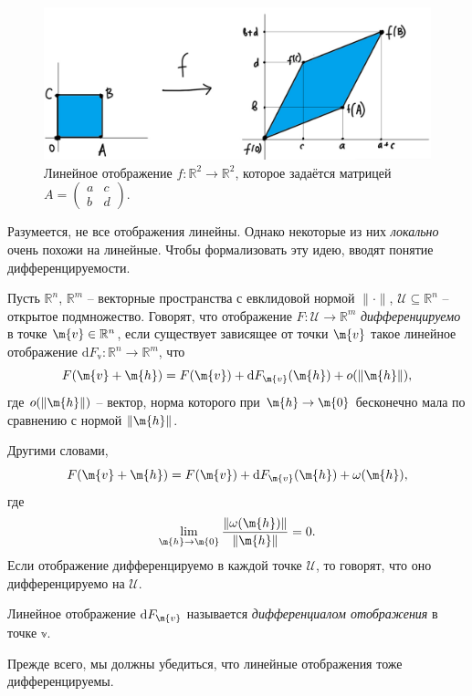 \begin{figure}[h!]
    \centering
    \includegraphics[scale = 0.5]{images/linear_map.jpg}
    \caption{Линейное отображение $f:\mathbb{R}^2 \to \mathbb{R}^2$, которое задаётся матрицей $A = \begin{pmatrix}
        a & c \\
        b & d
    \end{pmatrix}.$}
    \label{linear_map}
\end{figure}

Разумеется, не все отображения линейны. Однако некоторые из них \textit{локально} очень похожи на линейные. Чтобы формализовать эту идею, вводят понятие дифференцируемости.


\begin{definition}\label{diff_of_map(function)}
    Пусть $\mathbb{R}^n$, $\mathbb{R}^m$ -- векторные пространства с евклидовой нормой $\|\cdot \|$, $\mathscr{U} \subseteq \mathbb{R}^n$ -- открытое подмножество. Говорят, что отображение $F: \mathscr{U} \to \mathbb{R}^m$ \textit{дифференцируемо} в точке $\m{v} \in \mathbb{R}^n$, если существует зависящее от точки $\m{v}$ такое линейное отображение $\mathrm{d}F_{\mathbb{v}}:\mathbb{R}^n \to \mathbb{R}^m$, что
    \[
     F(\m{v} + \m{h})  = F(\m{v}) + \mathrm{d}F_\m{v}(\m{h}) + o(\|\m{h}\|),
    \]
где $o(\|\m{h}\|)$ -- вектор, норма которого при $\m{h} \to \m{0}$ бесконечно мала по сравнению с нормой $\|\m{h}\|$.

Другими словами, 
\[
     F(\m{v} + \m{h})  = F(\m{v}) + \mathrm{d}F_\m{v}(\m{h}) + \omega(\m{h}),
    \]
    где 
    \[
     \lim_{\m{h} \to \m{0}} \frac{\| \omega(\m{h})\|}{\| \m{h} \|} = 0.
    \]
Если отображение дифференцируемо в каждой точке $\mathscr{U}$, то говорят, что оно дифференцируемо на $\mathscr{U}$.

Линейное отображение $\mathrm{d}F_\m{v}$ называется \textit{дифференциалом отображения} в точке $\mathbb{v}$. 
\end{definition}

Прежде всего, мы должны убедиться, что линейные отображения тоже дифференцируемы.

